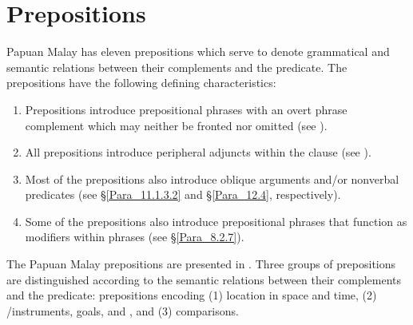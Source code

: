 \section{Prepositions}
\label{Para_5.11}
Papuan Malay has eleven prepositions which serve to denote grammatical and semantic relations between their complements and the predicate. The prepositions have the following defining characteristics:

\begin{enumerate}
\item 
Prepositions introduce prepositional phrases with an overt  phrase complement which may neither be fronted nor omitted (see ).

\item 
All prepositions introduce peripheral adjuncts within the clause (see ).

\item 
Most of the prepositions also introduce oblique arguments and/or nonverbal predicates (see §\ref{Para_11.1.3.2} and §\ref{Para_12.4}, respectively).

\item 
Some of the prepositions also introduce prepositional phrases that function as modifiers within  phrases (see §\ref{Para_8.2.7}).

\end{enumerate}

The Papuan Malay prepositions are presented in . Three groups of prepositions are distinguished according to the semantic relations between their complements and the predicate: prepositions encoding (1) location in space and time, (2) /instruments, goals, and , and (3) comparisons.


